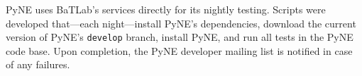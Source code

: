 \documentclass{anstrans}
\begin{document}

PyNE uses BaTLab's services directly for its nightly testing. Scripts were
developed that---each night---install PyNE's dependencies, download the current version
of PyNE's \texttt{develop} branch, install PyNE, and run all tests in the PyNE
code base. Upon completion, the PyNE developer mailing list is notified in case of
any failures.
\end{document}
